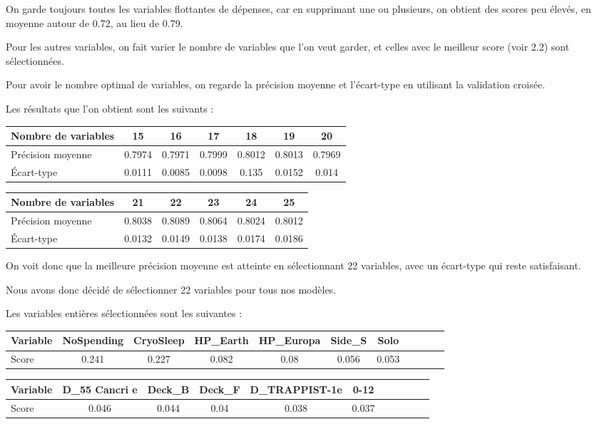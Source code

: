 \documentclass[a4paper]{article}
\begin{document}
    On garde toujours toutes les variables flottantes de dépenses, car en supprimant une ou plusieurs, on obtient des scores peu élevés,
    en moyenne autour de 0.72, au lieu de 0.79.

    Pour les autres variables, on fait varier le nombre de variables que l'on veut garder, 
    et celles avec le meilleur score (voir 2.2) sont sélectionnées.

    Pour avoir le nombre optimal de variables, on regarde la précision moyenne et l'écart-type en utilisant la validation croisée.

    Les résultats que l'on obtient sont les suivants :

    \begin{tabular}{| l | *{6}{c|}}
        \hline
        Nombre de variables & 15 & 16 & 17 & 18 & 19 & 20
        \tabularnewline
        \hline
        Précision moyenne & 0.7974 & 0.7971 & 0.7999 & 0.8012 & 0.8013 & 0.7969
        \tabularnewline
        \hline
        Écart-type & 0.0111 & 0.0085 & 0.0098 & 0.135 & 0.0152 & 0.014
        \tabularnewline
        \hline
    \end{tabular}

    \begin{tabular}{| l | *{5}{c|}}
        \hline
        Nombre de variables & 21 & 22 & 23 & 24 & 25
        \tabularnewline
        \hline
        Précision moyenne & 0.8038 & 0.8089 & 0.8064 & 0.8024 & 0.8012
        \tabularnewline
        \hline
        Écart-type & 0.0132 & 0.0149 & 0.0138 & 0.0174 & 0.0186
        \tabularnewline
        \hline
    \end{tabular}

    On voit donc que la meilleure précision moyenne est atteinte en sélectionnant 22 variables, avec un écart-type
    qui reste satisfaisant.

    Nous avons donc décidé de sélectionner 22 variables pour tous nos modèles.

    Les variables entières sélectionnées sont les suivantes :

    \begin{tabular}{| l | *{10}{c|}}
        \hline
        Variable & NoSpending & CryoSleep & HP\_Earth & HP\_Europa & Side\_S & Solo
        \tabularnewline
        \hline
        Score & 0.241 & 0.227 & 0.082 & 0.08 & 0.056 & 0.053
        \tabularnewline
        \hline
    \end{tabular}

    \begin{tabular}{| l | *{10}{c|}}
        \hline
        Variable & D\_55 Cancri e & Deck\_B & Deck\_F & D\_TRAPPIST-1e & 0-12
        \tabularnewline
        \hline
        Score & 0.046 & 0.044 & 0.04 & 0.038 & 0.037
        \tabularnewline
        \hline
    \end{tabular}
\end{document}
